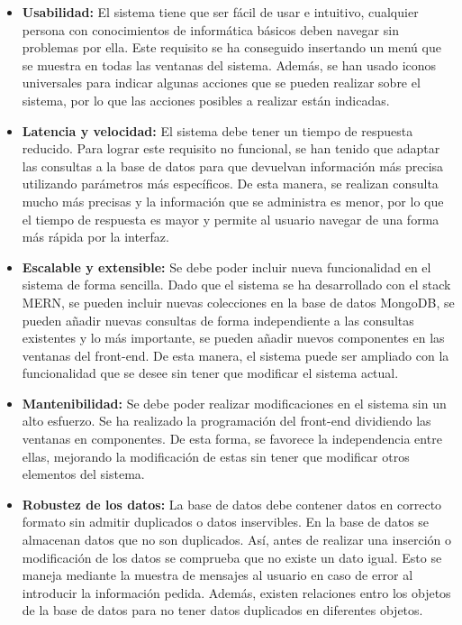 \begin{itemize}
    \item \textbf{Usabilidad:} El sistema tiene que ser fácil de usar e intuitivo, cualquier persona con conocimientos de informática básicos deben navegar sin problemas por ella. Este requisito se ha conseguido insertando un menú que se muestra en todas las ventanas del sistema. Además, se han usado iconos universales para indicar algunas acciones que se pueden realizar sobre el sistema, por lo que las acciones posibles a realizar están indicadas.
    
    \item \textbf{Latencia y velocidad:} El sistema debe tener un tiempo de respuesta reducido. Para lograr este requisito no funcional, se han tenido que adaptar las consultas a la base de datos para que devuelvan información más precisa utilizando parámetros más específicos. De esta manera, se realizan consulta mucho más precisas y la información que se administra es menor, por lo que el tiempo de respuesta es mayor y permite al usuario navegar de una forma más rápida por la interfaz.
    
    \item \textbf{Escalable y extensible:} Se debe poder incluir nueva funcionalidad en el sistema de forma sencilla. Dado que el sistema se ha desarrollado con el stack MERN, se pueden incluir nuevas colecciones en la base de datos MongoDB, se pueden añadir nuevas consultas de forma independiente a las consultas existentes y lo más importante, se pueden añadir nuevos componentes en las ventanas del front-end. De esta manera, el sistema puede ser ampliado con la funcionalidad que se desee sin tener que modificar el sistema actual.
    
    \item \textbf{Mantenibilidad:} Se debe poder realizar modificaciones en el sistema sin un alto esfuerzo. Se ha realizado la programación del front-end dividiendo las ventanas en componentes. De esta forma, se favorece la independencia entre ellas, mejorando la modificación de estas sin tener que modificar otros elementos del sistema.
    
    \item \textbf{Robustez de los datos:} La base de datos debe contener datos en correcto formato sin admitir duplicados o datos inservibles. En la base de datos se almacenan datos que no son duplicados. Así, antes de realizar una inserción o modificación de los datos se comprueba que no existe un dato igual. Esto se maneja mediante la muestra de mensajes al usuario en caso de error al introducir la información pedida. Además, existen relaciones entro los objetos de la base de datos para no tener datos duplicados en diferentes objetos. 
    

\end{itemize}
